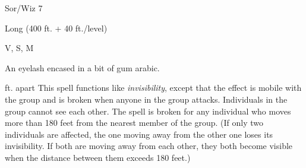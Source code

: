
\begin{description*}
\item[Level:] Sor/Wiz 7
\item[Range:] Long (400 ft. + 40 ft./level)
\item[Components:] V, S, M
\item[Arcane Material Component:] An eyelash encased in a bit of gum arabic.
\end{description*}

ft. apart
This spell functions like \textit{invisibility}, except that the effect is mobile
with the group and is broken when anyone in the group attacks. Individuals in the
group cannot see each other. The spell is broken for any individual who moves more
than 180 feet from the nearest member of the group. (If only two individuals are
affected, the one moving away from the other one loses its invisibility. If both
are moving away from each other, they both become visible when the distance between
them exceeds 180 feet.)